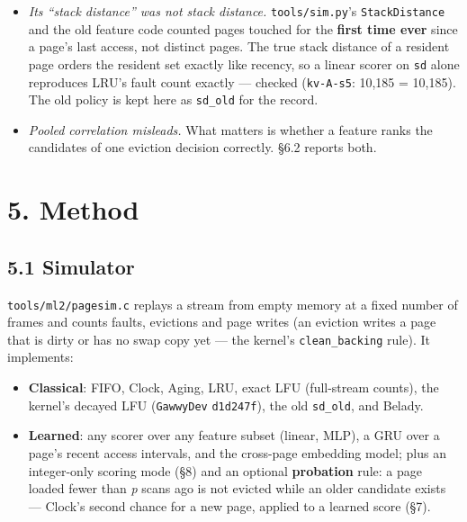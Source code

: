 \documentclass[10pt,a4paper]{article}
\newcommand{\code}[1]{\texttt{#1}}
\begin{document}
\begin{itemize}
\item \emph{Its ``stack distance'' was not stack distance.} \code{tools/\allowbreak{}sim.\allowbreak{}py}'s \code{StackDistance} and the old feature code counted pages touched for the \textbf{first time ever} since a page's last access, not distinct pages. The true stack distance of a resident page orders the resident set exactly like recency, so a linear scorer on \code{sd} alone reproduces LRU's fault count exactly — checked (\code{kv-A-s5}: 10,185 = 10,185). The old policy is kept here as \code{sd\_\allowbreak{}old} for the record.
\item \emph{Pooled correlation misleads.} What matters is whether a feature ranks the candidates of one eviction decision correctly. §6.2 reports both.
\end{itemize}

\section*{5. Method}

\subsection*{5.1 Simulator}

\code{tools/\allowbreak{}ml2/\allowbreak{}pagesim.\allowbreak{}c} replays a stream from empty memory at a fixed number of frames and counts faults, evictions and page writes (an eviction writes a page that is dirty or has no swap copy yet — the kernel's \code{clean\_\allowbreak{}backing} rule). It implements:

\begin{itemize}
\item \textbf{Classical}: FIFO, Clock, Aging, LRU, exact LFU (full-stream counts), the kernel's decayed LFU (\code{GawwyDev} \code{d1d247f}), the old \code{sd\_\allowbreak{}old}, and Belady.
\item \textbf{Learned}: any scorer over any feature subset (linear, MLP), a GRU over a page's recent access intervals, and the cross-page embedding model; plus an integer-only scoring mode (§8) and an optional \textbf{probation} rule: a page loaded fewer than \emph{p} scans ago is not evicted while an older candidate exists — Clock's second chance for a new page, applied to a learned score (§7).
\end{itemize}
\end{document}
